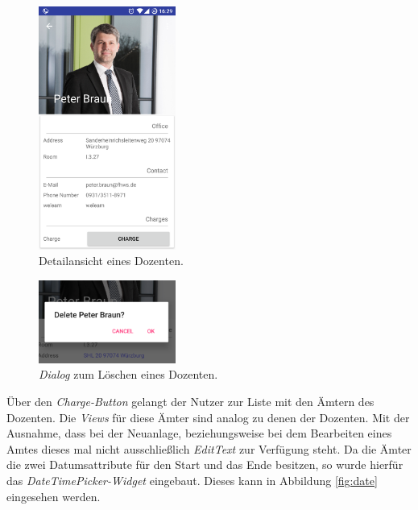 \begin{figure}[H]
	\begin{center}
		\includegraphics[width=0.4\textwidth]{images/detail.png}
		\caption{Detailansicht eines Dozenten.}
		\label{fig:detail_view}
	\end{center}
\end{figure}

\begin{figure}[H]
	\begin{center}
		\includegraphics[width=0.4\textwidth]{images/dialog.png}
		\caption{\textit{Dialog} zum Löschen eines Dozenten.}
		\label{fig:dialog}
	\end{center}
\end{figure}

Über den \textit{Charge-Button} gelangt der Nutzer zur Liste mit den Ämtern des Dozenten. Die \textit{Views} für diese Ämter sind analog zu denen der Dozenten. Mit der Ausnahme, dass bei der Neuanlage, beziehungsweise bei dem Bearbeiten eines Amtes dieses mal nicht ausschließlich \textit{EditText} zur Verfügung steht. Da die Ämter die zwei Datumsattribute für den Start und das Ende besitzen, so wurde hierfür das \textit{DateTimePicker-Widget} eingebaut. Dieses kann in Abbildung \ref{fig:date} eingesehen werden.

